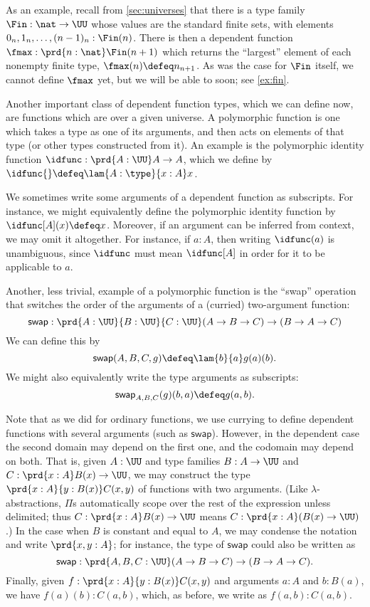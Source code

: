 As an example, recall from \cref{sec:universes} that there is a type family $\Fin:\nat\to\UU$ whose values are the standard finite sets, with elements $0_n,1_n,\dots,(n-1)_n : \Fin(n)$.
There is then a dependent function $\fmax : \prd{n:\nat} \Fin(n+1)$
which returns the ``largest'' element of each nonempty finite type, $\fmax(n) \defeq n_{n+1}$.
%
As was the case for $\Fin$ itself, we cannot define $\fmax$ yet, but we will be able to soon; see \cref{ex:fin}.

Another important class of dependent function types, which we can define now, are functions which are 
%
%
over a given universe.
A polymorphic function is one which takes a type as one of its arguments, and then acts on elements of that type (or other types constructed from it).
%
%
%
An example is the polymorphic identity function $\idfunc : \prd{A:\UU} A \to A$, which we define by $\idfunc{} \defeq \lam{A:\type}{x:A} x$.

We sometimes write some arguments of a dependent function as subscripts.
For instance, we might equivalently define the polymorphic identity function by $\idfunc[A](x) \defeq x$.
Moreover, if an argument can be inferred from context, we may omit it altogether.
For instance, if $a:A$, then writing $\idfunc(a)$ is unambiguous, since $\idfunc$ must mean $\idfunc[A]$ in order for it to be applicable to $a$.

Another, less trivial, example of a polymorphic function is the ``swap'' operation that switches the order of the arguments of a (curried) two-argument function:
\[ \mathsf{swap} : \prd{A:\UU}{B:\UU}{C:\UU} (A\to B\to C) \to (B\to A \to C)
\]
We can define this by
\[ \mathsf{swap}(A,B,C,g) \defeq \lam{b}{a} g(a)(b). \]
We might also equivalently write the type arguments as subscripts:
\[ \mathsf{swap}_{A,B,C}(g)(b,a) \defeq g(a,b). \]

Note that as we did for ordinary functions, we use currying to define dependent functions with
several arguments (such as $\mathsf{swap}$). However, in the dependent case the second domain may
depend on the first one, and the codomain may depend on both. That is,
given $A:\UU$ and type families $B : A \to \UU$ and $C : \prd{x:A}B(x) \to \UU$, we may construct
the type $\prd{x:A}{y : B(x)} C(x,y)$ of functions with two
arguments.
(Like $\lambda$-abstractions, $\Pi$s automatically scope over the rest of the expression unless delimited; thus $C : \prd{x:A}B(x) \to \UU$ means $C : \prd{x:A}(B(x) \to \UU)$.)
In the case when $B$ is constant and equal to $A$, we may condense the notation and write $\prd{x,y:A}$; for instance, the type of $\mathsf{swap}$ could also be written as
\[ \mathsf{swap} : \prd{A,B,C:\UU} (A\to B\to C) \to (B\to A \to C).
\]
Finally, given $f:\prd{x:A}{y : B(x)} C(x,y)$ and arguments $a:A$ and $b:B(a)$, we have $f(a)(b) : C(a,b)$, which,
as before, we write as $f(a,b) : C(a,b)$.

